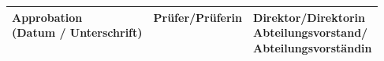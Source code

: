 \begin{center}
	\vfill
	
	\begin{table}[h!]
		\begin{tabular}{|p{52mm}|p{52mm}|p{52mm}|}
			\hline
			\makecell[l{{p{52mm}}}]{
				\small{Approbation} \\
				\small{(Datum / Unterschrift)} \\ ~ \\ ~ \\ ~ \\} &
			\makecell[l{{p{52mm}}}]{\small{Prüfer/Prüferin} \\ ~ \\ ~ \\ ~ \\ ~ \\} &
			\makecell[l{{p{52mm}}}]{
				\footnotesize{Direktor/Direktorin} \\
				\footnotesize{Abteilungsvorstand/} \\
				\footnotesize{Abteilungsvorständin}\\ ~ \\ ~ \\} \\
			\hline
		\end{tabular}
	\end{table}
\end{center}

\newpage
